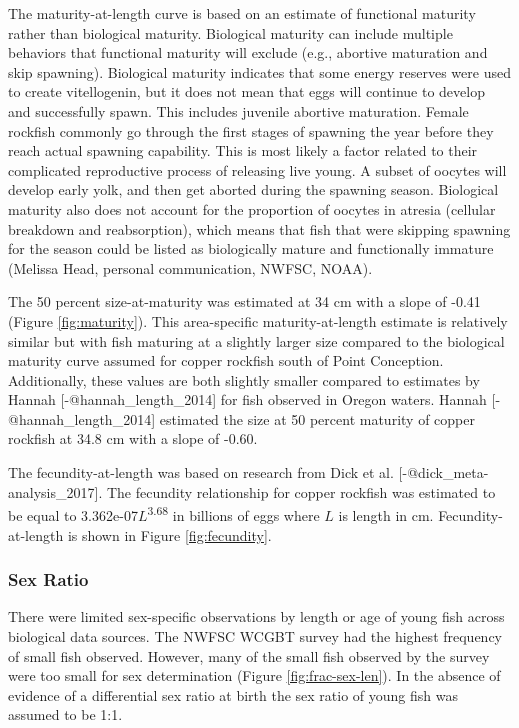 \documentclass[11pt,
  letterpaper,
]{article}
\begin{document}
The maturity-at-length curve is based on an estimate of functional maturity rather than biological maturity. Biological maturity can include multiple behaviors that functional maturity will exclude (e.g., abortive maturation and skip spawning). Biological maturity indicates that some energy reserves were used to create vitellogenin, but it does not mean that eggs will continue to develop and successfully spawn. This includes juvenile abortive maturation. Female rockfish commonly go through the first stages of spawning the year before they reach actual spawning capability. This is most likely a factor related to their complicated reproductive process of releasing live young. A subset of oocytes will develop early yolk, and then get aborted during the spawning season. Biological maturity also does not account for the proportion of oocytes in atresia (cellular breakdown and reabsorption), which means that fish that were skipping spawning for the season could be listed as biologically mature and functionally immature (Melissa Head, personal communication, NWFSC, NOAA).

The 50 percent size-at-maturity was estimated at 34 cm with a slope of -0.41 (Figure \ref{fig:maturity}). This area-specific maturity-at-length estimate is relatively similar but with fish maturing at a slightly larger size compared to the biological maturity curve assumed for copper rockfish south of Point Conception. Additionally, these values are both slightly smaller compared to estimates by Hannah {[}-@hannah\_length\_2014{]} for fish observed in Oregon waters. Hannah {[}-@hannah\_length\_2014{]} estimated the size at 50 percent maturity of copper rockfish at 34.8 cm with a slope of -0.60.

The fecundity-at-length was based on research from Dick et al. {[}-@dick\_meta-analysis\_2017{]}. The fecundity relationship for copper rockfish was estimated to be equal to 3.362e-07\(L\)\textsuperscript{3.68} in billions of eggs where \(L\) is length in cm. Fecundity-at-length is shown in Figure \ref{fig:fecundity}.

\subsubsection{Sex Ratio}\label{sex-ratio}

There were limited sex-specific observations by length or age of young fish across biological data sources. The NWFSC WCGBT survey had the highest frequency of small fish observed. However, many of the small fish observed by the survey were too small for sex determination (Figure \ref{fig:frac-sex-len}). In the absence of evidence of a differential sex ratio at birth the sex ratio of young fish was assumed to be 1:1.
\end{document}
